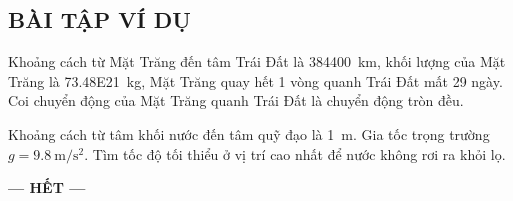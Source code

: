 \subsection{BÀI TẬP VÍ DỤ}
\setcounter{ex}{0}
\begin{ex}
	\loigiai{
		
	}
\end{ex}
\begin{ex}
	Khoảng cách từ Mặt Trăng đến tâm Trái Đất là \SI{384400}{\kilo\meter}, khối lượng của Mặt Trăng là \SI{73.48E21}{\kilogram}, Mặt Trăng quay hết 1 vòng quanh Trái Đất mất 29 ngày. Coi chuyển động của Mặt Trăng quanh Trái Đất là chuyển động tròn đều.	\loigiai{
		
	}
\end{ex}
\begin{ex}
	Khoảng cách từ tâm khối nước đến tâm quỹ đạo là \SI{1}{\meter}. Gia tốc trọng trường $g=\SI{9.8}{\meter/\second^2}$. Tìm tốc độ tối thiểu ở vị trí cao nhất để nước không rơi ra khỏi lọ.
	\loigiai{
		
	}
\end{ex}
\begin{center}
	\textbf{--- HẾT ---}
\end{center}